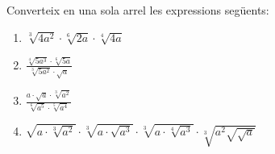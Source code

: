 \begin{exercici}
Converteix en una sola arrel les expressions següents:

\begin{enumerate}
\item[a)] $\sqrt[3]{4a^{2}}\cdot \sqrt[6]{2a}\cdot \sqrt[4]{4a}$

\item[b)] $\frac{\sqrt[4]{5a^{3}}\cdot \sqrt[6]{5a}}{\sqrt[3]{5a^{2}}\cdot 
\sqrt{a}}$

\item[c)] $\frac{a\cdot \sqrt{a}\cdot \sqrt[3]{a^{2}}}{\sqrt[6]{a^{5}}\cdot 
\sqrt[5]{a^{4}}}$

\item[d)] $\sqrt{a\cdot \sqrt[3]{a^{2}}}\cdot \sqrt[3]{a\cdot \sqrt{a^{3}}}%
\cdot \sqrt[3]{a\cdot \sqrt[4]{a^{3}}}\cdot \sqrt[3]{a^{2}\sqrt{\sqrt{a}}}$
\end{enumerate}

\end{exercici}

